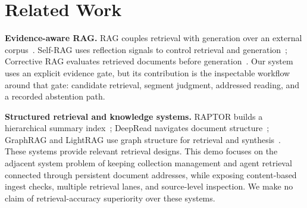 \section{Related Work}
\label{sec:related}

\textbf{Evidence-aware RAG.} RAG couples retrieval with generation
over an external corpus~\cite{rag-lewis}. Self-RAG uses reflection
signals to control retrieval and generation~\cite{selfrag}; Corrective
RAG evaluates retrieved documents before generation~\cite{crag}. Our
system uses an explicit evidence gate, but its contribution is the
inspectable workflow around that gate: candidate retrieval, segment
judgment, addressed reading, and a recorded abstention path.

\textbf{Structured retrieval and knowledge systems.} RAPTOR builds a
hierarchical summary index~\cite{raptor}; DeepRead navigates document
structure~\cite{deepread}; GraphRAG and LightRAG use graph structure
for retrieval and synthesis~\cite{graphrag,lightrag}. These systems
provide relevant retrieval designs. This demo focuses on the adjacent
system problem of keeping collection management and agent retrieval
connected through persistent document addresses, while exposing
content-based ingest checks, multiple retrieval lanes, and source-level
inspection. We make no claim of retrieval-accuracy superiority over
these systems.
